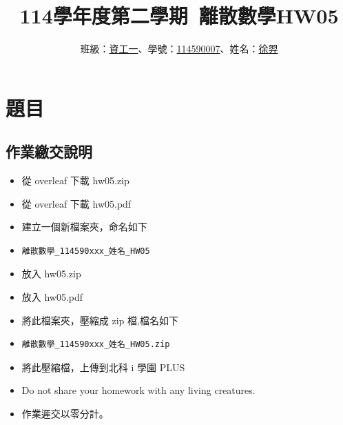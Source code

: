 \documentclass[sigconf]{acmart}
\begin{document}
\title{114學年度第二學期~離散數學HW05}

\author{班級：\underline{資工一}、學號：\underline{114590007}、姓名：\underline{徐羿}}
\orcid{}
\affiliation{%
  \institution{}
  \city{}
  \country{}
}


\renewcommand\footnotetextcopyrightpermission[1]{} %
\pagestyle{plain} %

\maketitle

\section{題目}
\subsection{作業繳交說明}
\begin{shaded}
\begin{itemize}
    \item[-] 從 overleaf 下載 hw05.zip
    \item[-] 從 overleaf 下載 hw05.pdf
    \item[-] 建立一個新檔案夾，命名如下
    \item[-] \color{red}\begin{verbatim}離散數學_114590xxx_姓名_HW05\end{verbatim}
    \item[-] \color{black}放入 hw05.zip
    \item[-] 放入 hw05.pdf
    \item[-] 將此檔案夾，壓縮成 zip 檔,檔名如下
    \item[-] \color{red}\begin{verbatim}離散數學_114590xxx_姓名_HW05.zip\end{verbatim}
    \item[-] \color{black}將此壓縮檔，上傳到北科 i 學園 PLUS
    \item[-] Do not share your homework with any living creatures.
    \item[-] 作業遲交以零分計。
\end{itemize}
\end{shaded}
\end{document}

